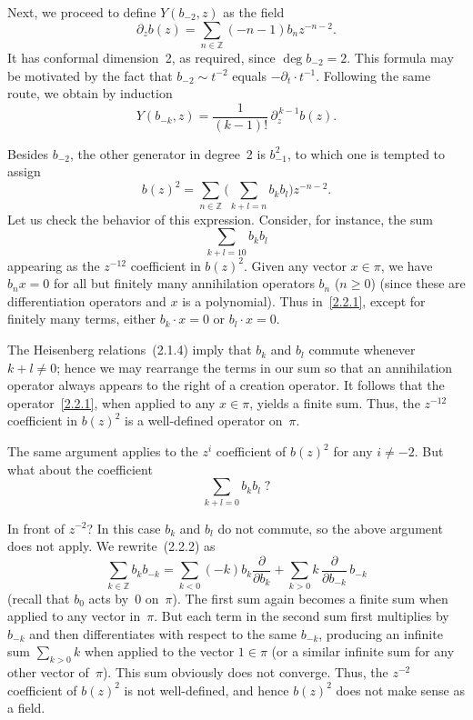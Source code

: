 \documentclass[12pt]{article}
\begin{document}
\medskip

Next, we proceed to define $Y(b_{-2}, z)$ as the field
\[
\partial_z b(z)
= \sum_{n\in\mathbb{Z}} (-n-1) b_n z^{-n-2}.
\]
It has conformal dimension~2, as required, since $\deg b_{-2} = 2$.
This formula may be motivated by the fact that $b_{-2} \sim t^{-2}$ equals $-\partial_t \cdot t^{-1}$.
Following the same route, we obtain by induction
\[
Y(b_{-k}, z)
= \frac{1}{(k-1)!}\,\partial_z^{\,k-1} b(z).
\]

Besides $b_{-2}$, the other generator in degree~2 is $b_{-1}^2$, to which one is tempted to assign
\[
b(z)^2
= \sum_{n\in\mathbb{Z}} \bigg(\sum_{k+l=n} b_k b_l\bigg) z^{-n-2}.
\]
Let us check the behavior of this expression.
Consider, for instance, the sum
\begin{equation}\label{2.2.1}
\sum_{k+l=10} b_k b_l
\end{equation}
appearing as the $z^{-12}$ coefficient in $b(z)^2$.
Given any vector $x\in\pi$, we have $b_n x = 0$ for all but finitely many annihilation operators $b_n$ ($n\ge 0$)
(since these are differentiation operators and $x$ is a polynomial).
Thus in~\eqref{2.2.1}, except for finitely many terms, either $b_k\cdot x = 0$ or $b_l\cdot x = 0$.

\medskip

The Heisenberg relations~(2.1.4) imply that $b_k$ and $b_l$ commute whenever $k+l\ne 0$;
hence we may rearrange the terms in our sum so that an annihilation operator always appears to the right of a creation operator.
It follows that the operator~\eqref{2.2.1}, when applied to any $x\in\pi$, yields a finite sum.
Thus, the $z^{-12}$ coefficient in $b(z)^2$ is a well-defined operator on~$\pi$.

\medskip

The same argument applies to the $z^i$ coefficient of $b(z)^2$ for any $i\ne -2$.
But what about the coefficient
\begin{equation}\label{2.2.2}
\sum_{k+l=0} b_k b_l\; ?
\end{equation}

In front of $z^{-2}$? In this case $b_k$ and $b_l$ do not commute, so the above argument does not apply.
We rewrite~(2.2.2) as
\[
\sum_{k\in\mathbb{Z}} b_k b_{-k}
= \sum_{k<0} (-k)b_k \frac{\partial}{\partial b_k}
  + \sum_{k>0} k\,\frac{\partial}{\partial b_{-k}}\,b_{-k}
\]
(recall that $b_0$ acts by~0 on~$\pi$).
The first sum again becomes a finite sum when applied to any vector in~$\pi$.
But each term in the second sum first multiplies by $b_{-k}$ and then differentiates with respect to the same $b_{-k}$, producing an infinite sum
$\sum_{k>0} k$ when applied to the vector $1\in\pi$ (or a similar infinite sum for any other vector of~$\pi$).
This sum obviously does not converge.
Thus, the $z^{-2}$ coefficient of $b(z)^2$ is not well-defined, and hence $b(z)^2$ does not make sense as a field.
\end{document}
